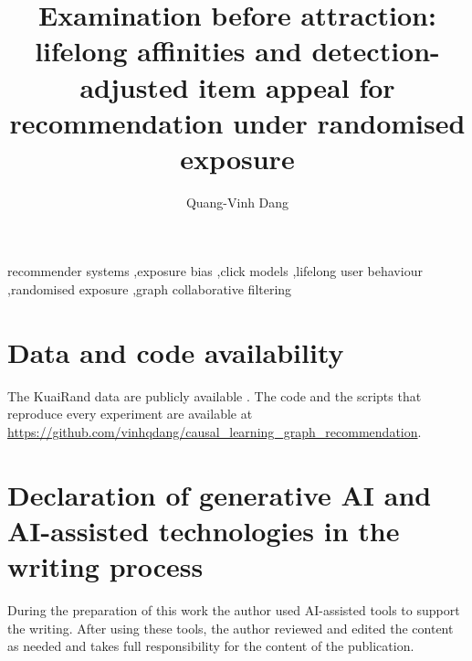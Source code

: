 \documentclass[preprint,12pt,authoryear]{elsarticle}
\begin{document}
\begin{frontmatter}
\title{Examination before attraction: lifelong affinities and detection-adjusted item appeal for recommendation under randomised exposure}
\author[buv]{Quang-Vinh Dang}
\begin{abstract}

\end{abstract}
\begin{keyword}
recommender systems \sep exposure bias \sep click models \sep lifelong user behaviour \sep randomised exposure \sep graph collaborative filtering
\end{keyword}
\end{frontmatter}








\section*{Data and code availability}
The KuaiRand data are publicly available \citep{gao2022kuairand}. The code and the scripts that reproduce every experiment are available at \url{https://github.com/vinhqdang/causal_learning_graph_recommendation}.

\section*{Declaration of generative AI and AI-assisted technologies in the writing process}
During the preparation of this work the author used AI-assisted tools to support the writing. After using these tools, the author reviewed and edited the content as needed and takes full responsibility for the content of the publication.


\appendix





\end{document}

